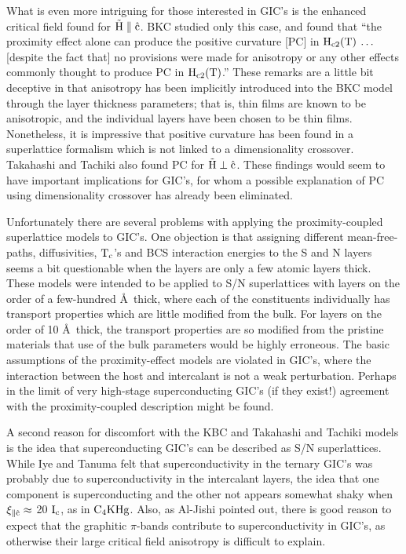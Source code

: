        What is  even more intriguing for  those interested in GIC's is the
enhanced  critical  field  found for   $\rm   \vec{H}  \parallel  \hat{c}$.
BKC\cite{biagi85}  studied  only this case, and  found that ``the proximity
effect alone can produce the positive curvature [PC] in $\rm H_{c2}(T) \: \ldots
\:$ [despite the fact that] no  provisions were made  for anisotropy or any
other effects commonly thought to produce PC in $\rm  H_{c2}(T)$.''   These
remarks are  a little bit deceptive  in that anisotropy has been implicitly
introduced into the BKC model  through the layer thickness parameters; that
is, thin films are known to be anisotropic,  and the individual layers have
been chosen to be thin films.  Nonetheless, it  is impressive that positive
curvature has been found in a superlattice formalism which is not linked to
a dimensionality crossover.  Takahashi  and Tachiki also  found PC for $\rm
\vec{H} \perp \hat{c}$.\cite{takahashi86b}  These findings would seem to
have important implications for GIC's, for whom  a possible  explanation of
PC using dimensionality crossover has already been eliminated.  

        Unfortunately there   are sev\-er\-al prob\-lems  with ap\-ply\-ing
the  prox\-im\-ity-coupled    su\-per\-lat\-tice  models to   GIC's.    One
objection is that assigning  different mean-free-paths, diffusivities, $\rm
T_c$'s and  BCS interaction energies to the  S and  N layers  seems   a bit
questionable  when the  layers are only  a few atomic  layers thick.  These
models were intended to be applied to S/N  superlattices with layers on the
order  of   a few-hundred \AA \   thick,  where each of   the  constituents
individually  has transport properties  which are little  modified from the
bulk.  For layers on the order of 10 \AA \  thick, the transport properties
are so modified from the pristine materials that use of the bulk parameters
would  be highly erroneous.   The basic assumptions of the proximity-effect
models are  violated in GIC's, where  the interaction between the  host and
intercalant is  not a weak  perturbation.  Perhaps  in the  limit   of very
high-stage superconducting   GIC's (if they  exist!)   agreement   with the
proximity-coupled description might be found.

        A second reason  for  discomfort with  the KBC   and  Takahashi and
Tachiki models is the idea that superconducting  GIC's can be  described as
S/N superlattices.  While Iye and Tanuma felt that superconductivity in the
ternary GIC's was  probably  due  to superconductivity in  the  intercalant
layers,\cite{iye82} the idea that one  component is superconducting and the
other not appears somewhat shaky when $\rm \xi_{\parallel \hat{c}} \approx $
20 $\rm I_c$, as in $\rm C_4KHg$.  Also, as Al-Jishi pointed out, there is
good  reason to expect    that  the  graphitic $\pi$-bands contribute   to
superconductivity  in GIC's,   as  otherwise  their  large critical   field
anisotropy is difficult to explain.\cite{M143}

